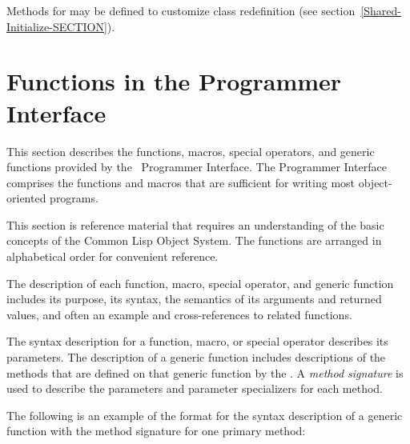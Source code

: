 Methods for  may be defined to customize class
redefinition (see section~\ref{Shared-Initialize-SECTION}).


\section{Functions in the Programmer Interface}
\label{Functions-in-the-Programmer-Interface-SECTION}

This section describes the functions, macros, special operators, and
generic functions provided by the \CLOS\ Programmer Interface.  The
Programmer Interface comprises the functions and macros that are
sufficient for writing most object-oriented programs.

This section is reference material that requires an understanding of
the basic concepts of the Common Lisp Object System.  The functions
are arranged in alphabetical order for convenient reference.

The description of each function, macro, special operator,
and generic function includes its purpose, its syntax, the
semantics of its arguments and returned values, and often an example
and cross-references to related functions.

The syntax description for a function, macro, or special operator
describes its parameters.
The description of a generic function includes descriptions of the
methods that are defined on that generic function by the \CLOS.  A
\emph{method signature\/} is used to describe the parameters and
parameter specializers for each method.

The following is an example of the format for
the syntax description of a generic function with the method
signature for one primary method:

